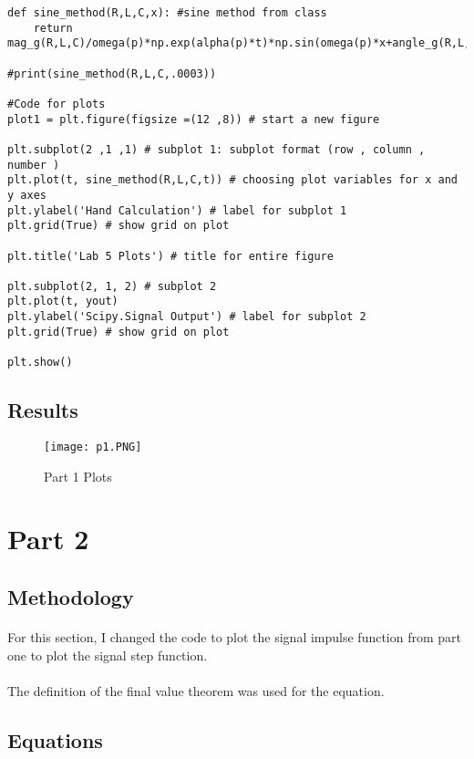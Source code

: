 \begin{scriptsize}
\begin{lstlisting}
def sine_method(R,L,C,x): #sine method from class
    return mag_g(R,L,C)/omega(p)*np.exp(alpha(p)*t)*np.sin(omega(p)*x+angle_g(R,L,C))

#print(sine_method(R,L,C,.0003))

#Code for plots
plot1 = plt.figure(figsize =(12 ,8)) # start a new figure

plt.subplot(2 ,1 ,1) # subplot 1: subplot format (row , column , number )
plt.plot(t, sine_method(R,L,C,t)) # choosing plot variables for x and y axes
plt.ylabel('Hand Calculation') # label for subplot 1
plt.grid(True) # show grid on plot

plt.title('Lab 5 Plots') # title for entire figure 

plt.subplot(2, 1, 2) # subplot 2
plt.plot(t, yout)
plt.ylabel('Scipy.Signal Output') # label for subplot 2
plt.grid(True) # show grid on plot

plt.show()

\end{lstlisting}
\end{scriptsize}

\subsection{Results}

 \begin{figure}[H]
	   \centering
	   \texttt{[image: p1.PNG]}
	   \caption{Part 1 Plots}
 \end{figure}


\section{Part 2}
\subsection{Methodology}

\paragraph{}
For this section, I changed the code to plot the signal impulse function from part one to plot the signal step function.  
\paragraph{}
The definition of the final value theorem was used for the equation.

\subsection{Equations}

